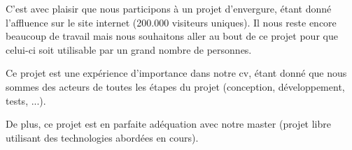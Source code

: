 C'est avec plaisir que nous participons à un projet d'envergure, étant donné l'affluence sur le site internet (200.000 visiteurs uniques). Il nous reste encore beaucoup de travail mais nous souhaitons aller au bout de ce projet pour que celui-ci soit utilisable par un grand nombre de personnes.

Ce projet est une expérience d'importance dans notre cv, étant donné que nous sommes des acteurs de toutes les étapes du projet (conception, développement, tests, ...).

De plus, ce projet est en parfaite adéquation avec notre master (projet libre utilisant des technologies abordées en cours).
